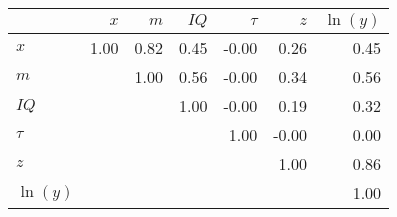 \begin{tabular}{lrrrrrr}
\hline
 & $x$  & $m$  & $IQ$  & $\tau$  & $z$  & $\ln(y)$  \\ 
\hline
$x$ & 1.00  & 0.82  & 0.45  & -0.00  & 0.26  & 0.45  \\ 
$m$ &   & 1.00  & 0.56  & -0.00  & 0.34  & 0.56  \\ 
$IQ$ &   &   & 1.00  & -0.00  & 0.19  & 0.32  \\ 
$\tau$ &   &   &   & 1.00  & -0.00  & 0.00  \\ 
$z$ &   &   &   &   & 1.00  & 0.86  \\ 
$\ln(y)$ &   &   &   &   &   & 1.00  \\ 
\hline
\end{tabular}%
